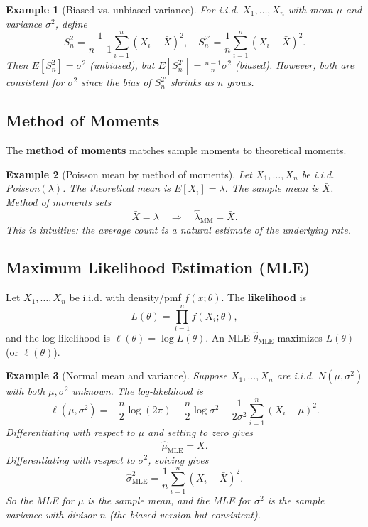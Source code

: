 \documentclass[11pt,a4paper]{article}
\newtheorem{example}{Example}[section]
\begin{document}
\begin{example}[Biased vs. unbiased variance]
For i.i.d. $X_1,\dots,X_n$ with mean $\mu$ and variance $\sigma^2$, define
\[
S_n^2 = \frac{1}{n-1}\sum_{i=1}^n (X_i - \bar{X})^2,
\quad
S_n^{2\prime} = \frac{1}{n}\sum_{i=1}^n (X_i - \bar{X})^2.
\]
Then $E[S_n^2] = \sigma^2$ (unbiased), but $E[S_n^{2\prime}] = \frac{n-1}{n}\sigma^2$ (biased). 
However, both are consistent for $\sigma^2$ since the bias of $S_n^{2\prime}$ shrinks as $n$ grows.

\end{example}

\subsection{Method of Moments}

The \textbf{method of moments} matches sample moments to theoretical moments.

\begin{example}[Poisson mean by method of moments]
Let $X_1,\dots,X_n$ be i.i.d. Poisson$(\lambda)$. 
The theoretical mean is $E[X_i] = \lambda$. 
The sample mean is $\bar{X}$. 
Method of moments sets
\[
\bar{X} = \lambda \quad \Rightarrow \quad \hat{\lambda}_{\text{MM}} = \bar{X}.
\]
This is intuitive: the average count is a natural estimate of the underlying rate.

\end{example}

\subsection{Maximum Likelihood Estimation (MLE)}

Let $X_1,\dots,X_n$ be i.i.d. with density/pmf $f(x;\theta)$. 
The \textbf{likelihood} is
\[
L(\theta) = \prod_{i=1}^n f(X_i;\theta),
\]
and the log-likelihood is $\ell(\theta) = \log L(\theta)$. 
An MLE $\hat{\theta}_{\text{MLE}}$ maximizes $L(\theta)$ (or $\ell(\theta)$).

\begin{example}[Normal mean and variance]
Suppose $X_1,\dots,X_n$ are i.i.d. $N(\mu,\sigma^2)$ with both $\mu,\sigma^2$ unknown. 
The log-likelihood is
\[
\ell(\mu,\sigma^2)
= -\frac{n}{2}\log(2\pi) - \frac{n}{2}\log\sigma^2
- \frac{1}{2\sigma^2}\sum_{i=1}^n (X_i-\mu)^2.
\]
Differentiating with respect to $\mu$ and setting to zero gives
\[
\hat{\mu}_{\text{MLE}} = \bar{X}.
\]
Differentiating with respect to $\sigma^2$, solving gives
\[
\hat{\sigma}^2_{\text{MLE}} = \frac{1}{n}\sum_{i=1}^n (X_i - \bar{X})^2.
\]
So the MLE for $\mu$ is the sample mean, and the MLE for $\sigma^2$ is the sample variance with divisor $n$ (the biased version but consistent).

\end{example}
\end{document}
